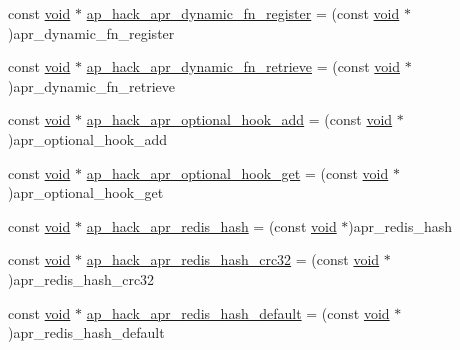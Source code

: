 \begin{DoxyCompactItemize}
\item 
const \hyperlink{group__MOD__ISAPI_gacd6cdbf73df3d9eed42fa493d9b621a6}{void} $\ast$ \hyperlink{srclib_2apr-util_2exports_8c_a229e6b1cdc0f23a917a5c9484afb465f}{ap\+\_\+hack\+\_\+apr\+\_\+dynamic\+\_\+fn\+\_\+register} = (const \hyperlink{group__MOD__ISAPI_gacd6cdbf73df3d9eed42fa493d9b621a6}{void} $\ast$)apr\+\_\+dynamic\+\_\+fn\+\_\+register
\item 
const \hyperlink{group__MOD__ISAPI_gacd6cdbf73df3d9eed42fa493d9b621a6}{void} $\ast$ \hyperlink{srclib_2apr-util_2exports_8c_a87a8e05def22ea9f09277240840c1669}{ap\+\_\+hack\+\_\+apr\+\_\+dynamic\+\_\+fn\+\_\+retrieve} = (const \hyperlink{group__MOD__ISAPI_gacd6cdbf73df3d9eed42fa493d9b621a6}{void} $\ast$)apr\+\_\+dynamic\+\_\+fn\+\_\+retrieve
\item 
const \hyperlink{group__MOD__ISAPI_gacd6cdbf73df3d9eed42fa493d9b621a6}{void} $\ast$ \hyperlink{srclib_2apr-util_2exports_8c_af251177bdf5bee7fd2731809721ad08b}{ap\+\_\+hack\+\_\+apr\+\_\+optional\+\_\+hook\+\_\+add} = (const \hyperlink{group__MOD__ISAPI_gacd6cdbf73df3d9eed42fa493d9b621a6}{void} $\ast$)apr\+\_\+optional\+\_\+hook\+\_\+add
\item 
const \hyperlink{group__MOD__ISAPI_gacd6cdbf73df3d9eed42fa493d9b621a6}{void} $\ast$ \hyperlink{srclib_2apr-util_2exports_8c_a7c6b214ebc3a597f59f4d3727a030f18}{ap\+\_\+hack\+\_\+apr\+\_\+optional\+\_\+hook\+\_\+get} = (const \hyperlink{group__MOD__ISAPI_gacd6cdbf73df3d9eed42fa493d9b621a6}{void} $\ast$)apr\+\_\+optional\+\_\+hook\+\_\+get
\item 
const \hyperlink{group__MOD__ISAPI_gacd6cdbf73df3d9eed42fa493d9b621a6}{void} $\ast$ \hyperlink{srclib_2apr-util_2exports_8c_af2cba27043310f6456fc44be1d21d057}{ap\+\_\+hack\+\_\+apr\+\_\+redis\+\_\+hash} = (const \hyperlink{group__MOD__ISAPI_gacd6cdbf73df3d9eed42fa493d9b621a6}{void} $\ast$)apr\+\_\+redis\+\_\+hash
\item 
const \hyperlink{group__MOD__ISAPI_gacd6cdbf73df3d9eed42fa493d9b621a6}{void} $\ast$ \hyperlink{srclib_2apr-util_2exports_8c_a8863260939a6bc14ae19d1077347a72f}{ap\+\_\+hack\+\_\+apr\+\_\+redis\+\_\+hash\+\_\+crc32} = (const \hyperlink{group__MOD__ISAPI_gacd6cdbf73df3d9eed42fa493d9b621a6}{void} $\ast$)apr\+\_\+redis\+\_\+hash\+\_\+crc32
\item 
const \hyperlink{group__MOD__ISAPI_gacd6cdbf73df3d9eed42fa493d9b621a6}{void} $\ast$ \hyperlink{srclib_2apr-util_2exports_8c_ace3e0cf34aadbc4c7088739763820475}{ap\+\_\+hack\+\_\+apr\+\_\+redis\+\_\+hash\+\_\+default} = (const \hyperlink{group__MOD__ISAPI_gacd6cdbf73df3d9eed42fa493d9b621a6}{void} $\ast$)apr\+\_\+redis\+\_\+hash\+\_\+default

\end{DoxyCompactItemize}
